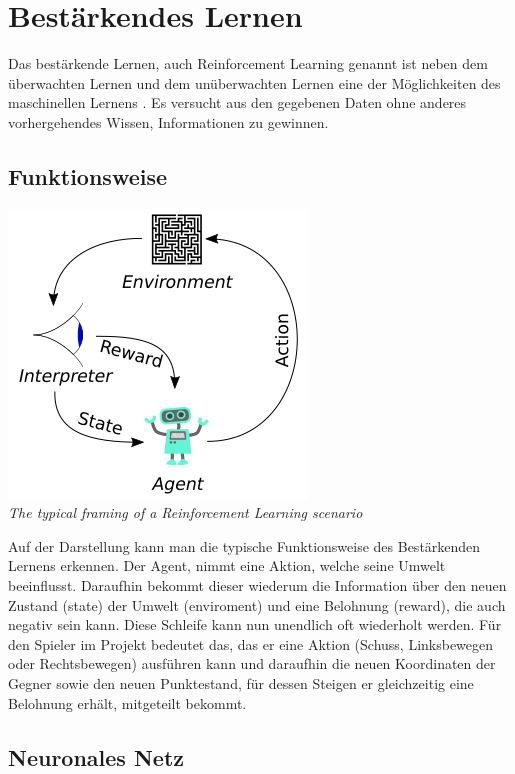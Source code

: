 
\chapter{Bestärkendes Lernen }
Das bestärkende Lernen, auch Reinforcement Learning genannt ist neben dem überwachten Lernen und dem unüberwachten Lernen eine der Möglichkeiten des maschinellen Lernens . Es versucht aus den gegebenen Daten ohne anderes  vorhergehendes Wissen, Informationen zu gewinnen\cite[vgl.][S.7]{li2017deep}.
\label{NN}
\section{Funktionsweise}
\begin{center}
 \includegraphics[scale = 1]{Bilder/Reinforcement_learning_diagram}\\
 \small{\textit{The typical framing of a Reinforcement Learning scenario}}\cite{RLdia}
\end{center}
Auf der Darstellung kann man die typische Funktionsweise des Bestärkenden Lernens erkennen.  Der Agent, nimmt eine Aktion, welche seine Umwelt beeinflusst. Daraufhin bekommt dieser wiederum die Information über den neuen Zustand (state) der Umwelt (enviroment) und eine Belohnung (reward), die auch negativ sein kann. Diese Schleife kann nun unendlich oft wiederholt werden. Für den Spieler im Projekt bedeutet das, das er eine Aktion (Schuss, Linksbewegen oder Rechtsbewegen) ausführen kann und daraufhin die neuen Koordinaten der Gegner sowie den neuen Punktestand, für dessen Steigen er gleichzeitig eine Belohnung erhält, mitgeteilt bekommt.   
\section{Neuronales Netz}

